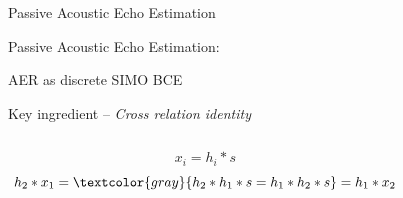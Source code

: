 \begin{frame}{Passive Acoustic Echo Estimation}
\begin{block}{\alert{Passive} Acoustic Echo Estimation:}
    \end{block}

\end{frame}

\begin{frame}{AER as discrete SIMO BCE}

    \begin{block}{Key ingredient -- \textit{Cross relation identity}}
        \begin{columns}[onlytextwidth]
            \[
                x_i = h_i \ast s
            \]
            \[
                h_2 \ast x_1 = \textcolor{gray}{h_2 \ast h_1 \ast s  = h_1 \ast h_2 \ast s} = h_1 \ast x_2
            \]

            \centering
        \end{columns}
    \end{block}

    \vspace*{-1em}


\end{frame}
